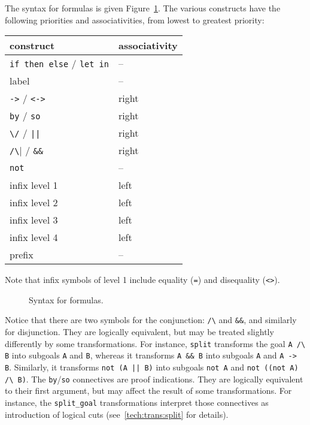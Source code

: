 The syntax for formulas is given Figure~\ref{fig:bnf:formula}.
The various constructs have the following priorities and
associativities, from lowest to greatest priority:
\begin{center}
  \begin{tabular}{|l|l|}
    \hline
    construct & associativity \\
    \hline\hline
    \texttt{if then else} / \texttt{let in} & -- \\
    label & -- \\
    \texttt{->} / \texttt{<->} & right \\
    \texttt{by} / \texttt{so} & right \\
    \verb!\/! / \verb!||! & right \\
    \verb|/\| / \verb!&&! & right \\
    \texttt{not}  & -- \\
    infix level 1 & left \\
    infix level 2 & left \\
    infix level 3 & left \\
    infix level 4 & left \\
    prefix        & --   \\
    \hline
  \end{tabular}
\end{center}
Note that infix symbols of level 1 include equality (\texttt{=}) and
disequality (\texttt{<>}).

\begin{figure}
  \begin{center}\framebox{}\end{center}
  \caption{Syntax for formulas.}
\label{fig:bnf:formula}
\end{figure}

Notice that there are two symbols for the conjunction: \verb|/\|
and \verb|&&|, and similarly for disjunction. They are logically
equivalent, but may be treated slightly differently by some
transformations. For instance, \texttt{split} transforms the goal
\verb|A /\ B| into subgoals \verb|A| and \verb|B|, whereas it transforms
\verb|A && B| into subgoals \verb|A| and \verb|A -> B|. Similarly, it
transforms \verb!not (A || B)! into subgoals \verb|not A| and
\verb|not ((not A) /\ B)|.
The \texttt{by}/\texttt{so} connectives are proof indications. They are
logically equivalent to their first argument, but may affect the result
of some transformations. For instance, the \texttt{split\_goal}
transformations interpret those connectives as introduction of logical cuts
 (see~\ref{tech:trans:split} for details).

